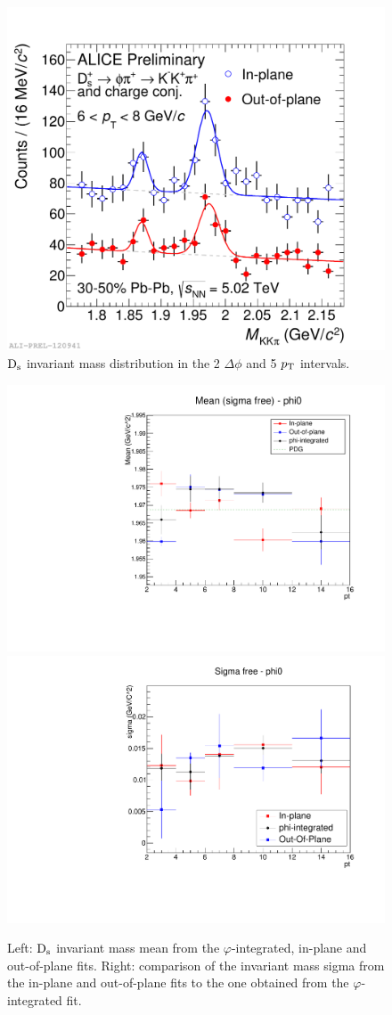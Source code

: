 \begin{figure}
\centering
 \includegraphics[width=.7\textwidth]{FigCap5/MassDsInOutOfPlane_PbPb3050_5TeV_pt6-8.pdf}
\caption{${\rm D_s}$ invariant mass distribution in the 2 $\Delta\phi$ and 5 $p_{\rm T}$ intervals.}
\label{fig:deltaphibinsds}
\end{figure}
\begin{figure}
\centering
 \includegraphics[width=.43\textwidth]{FigCap5/MeanDsInOutFull.pdf}
 \includegraphics[width=.43\textwidth]{FigCap5/SigmaDsInOutFull.pdf}
\caption{Left: ${\rm D_s}$ invariant mass mean from the $\varphi$-integrated, in-plane and out-of-plane fits. Right: comparison of the invariant mass sigma from the in-plane and out-of-plane fits to the one obtained from the $\varphi$-integrated fit.}
\label{fig:deltaphibinsds}
\end{figure}

